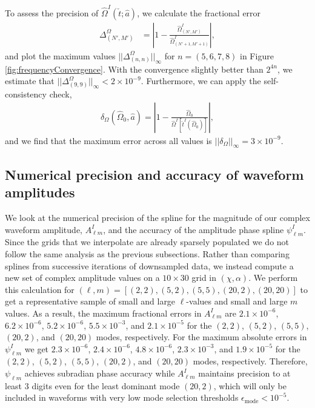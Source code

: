 \documentclass[%
 reprint,
 nofootinbib,
 amsmath,amssymb,
 aps,
 prd,
]{revtex4-2}
\begin{document}
To assess the precision of $\hat{\Omega}^I(\check{t};\hat{a})$, we calculate the fractional error
\begin{align}
    \Delta^\Omega_{(N',M')} &= \left| 1 - \frac{\hat{\Omega}^I_{(N',M')}}{\hat{\Omega}^I_{(N'+1,M'+1)}} \right|,
\end{align}
and plot the maximum values $||\Delta^\Omega_{(n,n)}||_\infty$ for $n = (5, 6, 7, 8)$ in Figure \ref{fig:frequencyConvergence}. With the convergence slightly better than $2^{4n}$, we estimate that $||\Delta^\Omega_{(9,9)}||_\infty < 2\times 10^{-9}$. Furthermore, we can apply the self-consistency check,
\begin{align}
    \delta_{\Omega}(\hat{\Omega}_0, \hat{a}) = \left| 1- \frac{\hat{\Omega}_0}{\hat{\Omega}^I[\check{t}^I(\hat{\Omega}_0)]} \right|,
\end{align}
and we find that the maximum error across all values is $||\delta_{\Omega}||_\infty = 3\times 10^{-9}$.

\subsection{Numerical precision and accuracy of waveform amplitudes}
\label{app:ampAccuracy}

We look at the numerical precision of the spline for the magnitude of our complex waveform amplitude, $A^I_{\ell m}$, and the accuracy of the amplitude phase spline $\psi^I_{\ell m}$. Since the grids that we interpolate are already sparsely populated we do not follow the same analysis as the previous subsections. Rather than comparing splines from successive iterations of downsampled data, we instead compute a new set of complex amplitude values on a $10 \times 30$ grid in $(\chi, \alpha)$. We perform this calculation for $(\ell,m) = [(2,2), (5,2), (5,5), (20,2), (20,20)]$ to get a representative sample of small and large $\ell$-values and small and large $m$ values. As a result, the maximum fractional errors in $A^I_{\ell m}$ are $2.1\times10^{-6}$, $6.2\times10^{-6}$, $5.2\times10^{-6}$, $5.5\times10^{-3}$, and $2.1\times10^{-5}$ for the $(2,2)$, $(5,2)$, $(5,5)$, $(20,2)$, and $(20,20)$ modes, respectively. For the maximum absolute errors in $\psi^I_{\ell m}$ we get $2.3\times10^{-6}$, $2.4\times10^{-6}$, $4.8\times10^{-6}$, $2.3\times10^{-3}$, and $1.9\times10^{-5}$ for the $(2,2)$, $(5,2)$, $(5,5)$, $(20,2)$, and $(20,20)$ modes, respectively. Therefore, $\psi_{\ell m}$ achieves subradian phase accuracy while $A^I_{\ell m}$ maintains precision to at least 3 digits even for the least dominant mode $(20, 2)$, which will only be included in waveforms with very low mode selection thresholds $\epsilon_\mathrm{mode} < 10^{-5}$.
\end{document}
